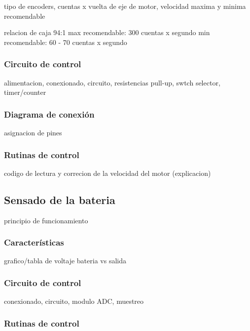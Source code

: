 tipo de encoders, cuentas x vuelta de eje de motor, velocidad maxima y minima recomendable

relacion de caja 94:1
max recomendable: 300 cuentas x segundo
min recomendable: 60 - 70 cuentas x segundo

\subsubsection{Circuito de control}
\label{h_sensado_encoder_circuito}

alimentacion, conexionado, circuito, resistencias pull-up, swtch selector, timer/counter

\subsubsection{Diagrama de conexi\'on}
\label{h_sensado_encoder_diagrama}

asignacion de pines

\subsubsection{Rutinas de control}
\label{h_sensado_encoder_rutinas}

codigo de lectura y correcion de la velocidad del motor (explicacion)

\subsection{Sensado de la bateria}
\label{h_sensado_bateria}

principio de funcionamiento

\subsubsection{Caracter\'isticas}
\label{h_sensado_bateria_caracteristicas}

grafico/tabla de voltaje bateria vs salida

\subsubsection{Circuito de control}
\label{h_sensado_bateria_circuito}

conexionado, circuito, modulo ADC, muestreo

\subsubsection{Rutinas de control}
\label{h_sensado_bateria_rutina}

